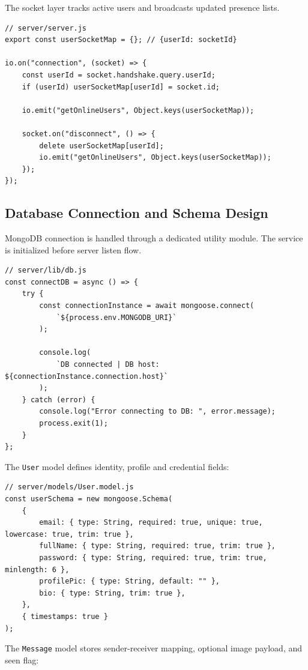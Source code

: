 \documentclass[12pt,a4paper]{report}
\begin{document}
The socket layer tracks active users and broadcasts updated presence lists.

\begin{verbatim}
// server/server.js
export const userSocketMap = {}; // {userId: socketId}

io.on("connection", (socket) => {
    const userId = socket.handshake.query.userId;
    if (userId) userSocketMap[userId] = socket.id;

    io.emit("getOnlineUsers", Object.keys(userSocketMap));

    socket.on("disconnect", () => {
        delete userSocketMap[userId];
        io.emit("getOnlineUsers", Object.keys(userSocketMap));
    });
});
\end{verbatim}

\subsection{Database Connection and Schema Design}
MongoDB connection is handled through a dedicated utility module. The service is initialized before server listen flow.

\begin{verbatim}
// server/lib/db.js
const connectDB = async () => {
    try {
        const connectionInstance = await mongoose.connect(
            `${process.env.MONGODB_URI}`
        );

        console.log(
            `DB connected | DB host: ${connectionInstance.connection.host}`
        );
    } catch (error) {
        console.log("Error connecting to DB: ", error.message);
        process.exit(1);
    }
};
\end{verbatim}

The \texttt{User} model defines identity, profile and credential fields:

\begin{verbatim}
// server/models/User.model.js
const userSchema = new mongoose.Schema(
    {
        email: { type: String, required: true, unique: true, lowercase: true, trim: true },
        fullName: { type: String, required: true, trim: true },
        password: { type: String, required: true, trim: true, minlength: 6 },
        profilePic: { type: String, default: "" },
        bio: { type: String, trim: true },
    },
    { timestamps: true }
);
\end{verbatim}

The \texttt{Message} model stores sender-receiver mapping, optional image payload, and seen flag:
\end{document}
